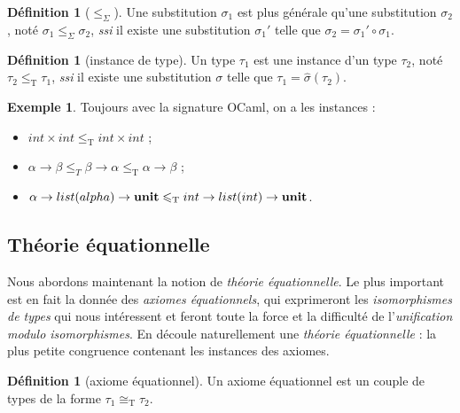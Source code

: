 \documentclass[a4paper]{report}
\theoremstyle{definition}
\newtheorem{definition}[theoreme]{Définition}
\newtheorem{exemple}[theoreme]{Exemple}
\newcommand{\ssi}{\textit{ssi}\xspace}
\newcommand{\unit}{\bold{unit}}
\newcommand{\T}{\mathrm{T}}
\begin{document}
\begin{definition}[$\leqslant_\Sigma$]
	Une substitution $\sigma_1$ est plus générale qu'une substitution $\sigma_2$, noté $\sigma_1 \leqslant_\Sigma \sigma_2$, \ssi il existe une substitution $\sigma_1'$ telle que $\sigma_2 = \sigma_1' \circ \sigma_1$.
\end{definition}

\begin{definition}[instance de type]
	Un type $\tau_1$ est une instance d'un type $\tau_2$, noté $\tau_2 \leqslant_\T \tau_1$, \ssi il existe une substitution $\sigma$ telle que $\tau_1 = \hat\sigma (\tau_2)$.
\end{definition}

\begin{exemple}
	Toujours avec la signature OCaml, on a les instances :
	\begin{itemize}
		\item $int \times int \leqslant_\T int \times int$ ;
		\item $\alpha \rightarrow \beta \leqslant_T \beta \rightarrow \alpha \leqslant_\T \alpha \rightarrow \beta$ ;
		\item $\alpha \rightarrow list (alpha) \rightarrow \unit \leqslant_\T int \rightarrow list (int) \rightarrow \unit$.
	\end{itemize}
\end{exemple}


\subsection{Théorie équationnelle}

Nous abordons maintenant la notion de \emph{théorie équationnelle}. Le plus important est en fait la donnée des \emph{axiomes équationnels}, qui exprimeront les \emph{isomorphismes de types} qui nous intéressent  et feront toute la force et la difficulté de l'\emph{unification modulo isomorphismes}. En découle naturellement une \emph{théorie équationnelle} : la plus petite congruence contenant les instances des axiomes.

\begin{definition}[axiome équationnel]
	Un axiome équationnel est un couple de types de la forme $\tau_1 \cong_\T \tau_2$.
\end{definition}
\end{document}
